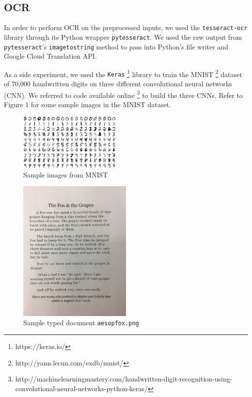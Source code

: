 \documentclass[11pt,letterpaper]{article}
\begin{document}
\subsection{OCR}

In order to perform OCR on the preprocessed inputs, we used the {\tt tesseract-ocr} library through its Python wrapper {\tt pytesseract}. We used the raw output from {\tt pytesseract}'s {\tt image\textunderscore to\textunderscore string} method to pass into Python's file writer and Google Cloud Translation API.

As a side experiment, we used the {\tt Keras} \footnote{https://keras.io/} library to train the MNIST \footnote{http://yann.lecun.com/exdb/mnist/} dataset of 70,000 handwritten digits on three different convolutional neural networks (CNN). We referred to code available online \footnote{http://machinelearningmastery.com/handwritten-digit-recognition-using-convolutional-neural-networks-python-keras/} to build the three CNNs. Refer to Figure 1 for some sample images in the MNIST dataset.

\begin{figure}[t!]
  \centering
  \includegraphics[keepaspectratio, width=0.45\textwidth]{mnist.png}
  \caption{Sample images from MNIST}
\end{figure}

\begin{figure}[t!]
  \centering
  \includegraphics[keepaspectratio, width=0.5\textwidth]{fox.png}
  \caption{Sample typed document {\tt aesop\textunderscore fox.png}}
\end{figure}
\end{document}
